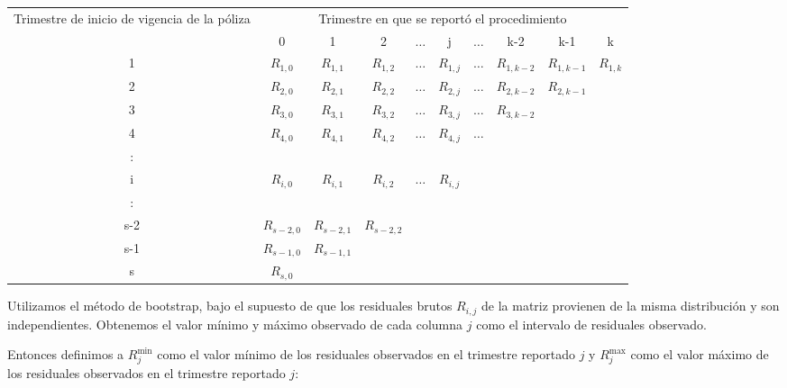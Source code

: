 \documentclass[11pt,twoside,openright,spanish]{report}
\numberwithin{equation}{chapter}
\numberwithin{figure}{chapter}
\numberwithin{table}{chapter}
\begin{document}
	\begin{table}[ht]
		\centering
		\begin{tabularx}{\linewidth}{ c|ccccccccc}
			\multirow{2}{4cm}{Trimestre de inicio de vigencia de la póliza}
			& \multicolumn{9}{c}{Trimestre en que se reportó el procedimiento} \\
			& 0  & 1 & 2 & $ \dots $ & j & $\dots $ & k-2 & k-1 &  k \\
			\midrule
			1      &  $R_{1,0}^{ }$ & $R_{1,1}^{ }$ & $R_{1,2}^{ }$ & $ \dots $ & $R_{1,j}^{ }$ & $ \dots $ & $R_{1,k-2}^{ }$ & $R_{1,k-1}^{ }$ & $R_{1,k}^{ }$ \\
			2      &  $R_{2,0}^{ }$ & $R_{2,1}^{ }$ & $R_{2,2}^{ }$ & $ \dots $ & $R_{2,j}^{ }$ & $ \dots $ & $R_{2,k-2}^{ }$ & $R_{2,k-1}^{ }$ & \\
			3      &  $R_{3,0}^{ }$ & $R_{3,1}^{ }$ & $R_{3,2}^{ }$ & $ \dots $ & $R_{3,j}^{ }$ & $ \dots $ & $R_{3,k-2}^{ }$ & & \\
			4      &  $R_{4,0}^{ }$ & $R_{4,1}^{ }$ & $R_{4,2}^{ }$ & $ \dots $ & $R_{4,j}^{ }$ & $ \dots $ & & & \\
			:      & & & & & & & & & \\
			i      &  $R_{i,0}^{ }$ & $R_{i,1}^{ }$ & $R_{i,2}^{ }$ & $ \dots $ & $R_{i,j}^{ }$ & & & & \\
			:      & & & & & & & & & \\
			s-2      &  $R_{s-2,0}^{ }$ & $R_{s-2,1}^{ }$ & $R_{s-2,2}^{ }$ & & & & & & \\
			s-1      &  $R_{s-1,0}^{ }$ & $R_{s-1,1}^{ }$ & & & & & & & \\
			s      &  $R_{s,0}^{ }$ & & & & & & & & \\
		\end{tabularx}
	\end{table}
 
	Utilizamos el método de bootstrap, bajo el supuesto de que los residuales brutos $R_{i,j}$ de la matriz provienen de la misma distribución y son independientes. Obtenemos el valor mínimo y máximo observado de cada columna $j$ como el intervalo de residuales observado.
	 
	Entonces definimos a $R_{j}^{\text{min}}$ como el valor mínimo de los residuales observados en el trimestre reportado $j$ y $R_{j}^{\text{max}}$ como el valor máximo de los residuales observados en el trimestre reportado $j$:
	
\end{document}
